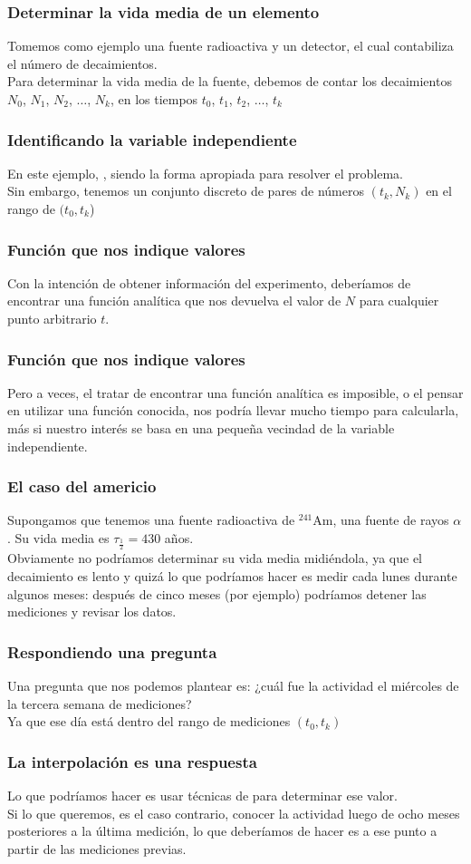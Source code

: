 \documentclass[12pt]{beamer}
\begin{document}
\begin{frame}
\frametitle{Determinar la vida media de un elemento}
Tomemos como ejemplo una fuente radioactiva y un detector, el cual contabiliza el número de decaimientos.
\\
\bigskip
\pause
Para determinar la vida media de la fuente, debemos de contar los decaimientos $N_{0}$, $N_{1}$, $N_{2}$, $\ldots$, $N_{k}$, en los tiempos $t_{0}$, $t_{1}$, $t_{2}$, $\ldots$, $t_{k}$
\end{frame}
\begin{frame}
\frametitle{Identificando la variable independiente}
En este ejemplo, , siendo la forma  apropiada para resolver el problema. 
\\
\bigskip
\pause
Sin embargo, tenemos un conjunto discreto de pares de números $(t_{k}, N_{k})$ en el rango de $(t_{0}, t_{k}$)
\end{frame}
\begin{frame}
\frametitle{Función que nos indique valores}
Con la intención de obtener información del experimento, deberíamos de encontrar una función analítica que nos devuelva el valor de $N$ para cualquier punto arbitrario $t$.
\end{frame}
\begin{frame}
\frametitle{Función que nos indique valores}
Pero a veces, el tratar de encontrar una función analítica es imposible, o el pensar en utilizar una función conocida, nos podría llevar mucho tiempo para calcularla, más si nuestro interés se basa en una pequeña vecindad de la variable independiente.
\end{frame}
\begin{frame}
\frametitle{El caso del americio}
Supongamos que tenemos una fuente radioactiva de {}$^{241}$Am, una fuente de rayos $\alpha$. Su vida media es $\tau_{\frac{1}{2}} = 430$ años.
\\
\bigskip
\pause
Obviamente no podríamos determinar su vida media midiéndola, ya que el decaimiento es lento y quizá lo que podríamos hacer es medir cada lunes durante algunos meses: después de cinco meses (por ejemplo) podríamos detener las mediciones y revisar los datos.
\end{frame}
\begin{frame}
\frametitle{Respondiendo una pregunta}
Una pregunta que nos podemos plantear es: ¿cuál fue la actividad el miércoles de la tercera semana de mediciones? 
\\
\bigskip
\pause
Ya que ese día está dentro del rango de mediciones $(t_{0}, t_{k})$
\end{frame}
\begin{frame}
\frametitle{La interpolación es una respuesta}
Lo que podríamos hacer es usar técnicas de  para determinar ese valor.  
\\
\bigskip
\pause
Si lo que queremos, es el caso contrario, conocer la actividad luego de ocho meses posteriores a la última medición, \pause lo que deberíamos de hacer es  a ese punto a partir de las mediciones previas.
\end{frame}
\end{document}
